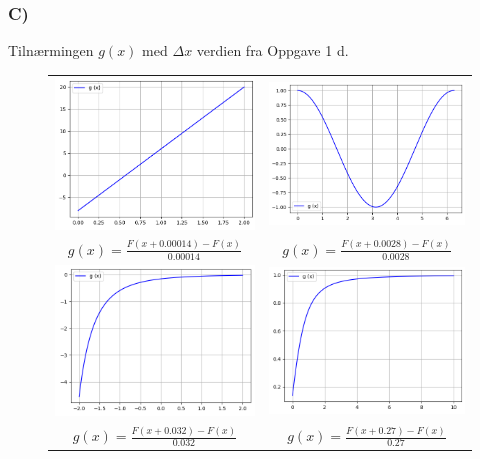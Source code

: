     \subsubsection{C)} Tilnærmingen $g(x)$ med $\Delta x$ verdien fra Oppgave 1 d.
        \begin{figure}[h!]
            \begin{tabular}{cc}
            \includegraphics[width=75mm]{Figures/del1_2c_1.png} &   \includegraphics[width=75mm]{Figures/del1_2c_2.png} \\
            $g(x)=\frac{F(x+0.00014)-F(x)}{0.00014}$ & $g(x)=\frac{F(x+0.0028)-F(x)}{0.0028}$\\[6pt]
            \includegraphics[width=75mm]{Figures/del1_2c_3.png} &   \includegraphics[width=75mm]{Figures/del1_2c_4.png} \\
            $g(x)=\frac{F(x+0.032)-F(x)}{0.032}$ & $g(x)=\frac{F(x+0.27)-F(x)}{0.27}$\\[6pt]
            \end{tabular}
        \end{figure}
        \newpage
